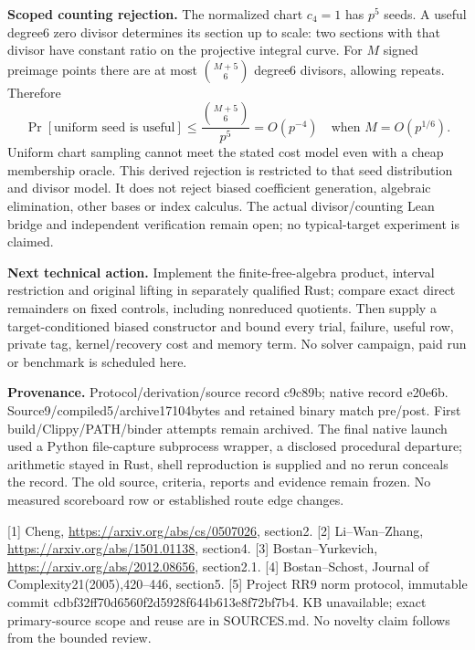 \documentclass[10pt]{article}
\begin{document}
\textbf{Scoped counting rejection.} The normalized chart \(c_4=1\) has \(p^5\)
seeds. A useful degree6 zero divisor determines its section up to scale:
two sections with that divisor have constant ratio on the projective integral
curve. For \(M\) signed preimage points there are at most
\(\binom{M+5}{6}\) degree6 divisors, allowing repeats. Therefore
\[
\Pr[\text{uniform seed is useful}]
 \le \frac{\binom{M+5}{6}}{p^5}=O(p^{-4})
 \quad\text{when }M=O(p^{1/6}).
\]
Uniform chart sampling cannot meet the stated cost model even with a cheap
membership oracle. This derived rejection is restricted to that seed
distribution and divisor model. It does not reject biased coefficient
generation, algebraic elimination, other bases or index calculus.
The actual divisor/counting Lean bridge and independent verification remain
open; no typical-target experiment is claimed.

\textbf{Next technical action.} Implement the finite-free-algebra product,
interval restriction and original lifting in separately qualified Rust; compare
exact direct remainders on fixed controls, including nonreduced quotients.
Then supply a target-conditioned biased constructor and bound every trial,
failure, useful row, private tag, kernel/recovery cost and memory term.
No solver campaign, paid run or benchmark is scheduled here.

\textbf{Provenance.} Protocol/derivation/source record c9c89b; native record
e20e6b. Source9/compiled5/archive17104bytes and retained binary match pre/post.
First build/Clippy/PATH/binder attempts remain archived. The final native
launch used a Python file-capture subprocess wrapper, a disclosed procedural
departure; arithmetic stayed in Rust, shell reproduction is supplied and no
rerun conceals the record. The old source, criteria, reports and evidence
remain frozen. No measured scoreboard row or established route edge changes.

{\small
[1] Cheng, \url{https://arxiv.org/abs/cs/0507026}, section2.
[2] Li--Wan--Zhang, \url{https://arxiv.org/abs/1501.01138}, section4.
[3] Bostan--Yurkevich, \url{https://arxiv.org/abs/2012.08656}, section2.1.
[4] Bostan--Schost, Journal of Complexity21(2005),420--446, section5.
[5] Project RR9 norm protocol, immutable commit cdbf32ff70d6560f2d5928f644b613e8f72bf7b4.
KB unavailable; exact primary-source scope and reuse are in SOURCES.md.
No novelty claim follows from the bounded review.}
\end{document}
